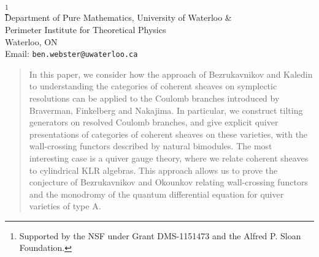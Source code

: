 \documentclass[final]{amsart}
\begin{document}
\begin{center}
\noindent {\large  \bf \thetitle}
\medskip

\footnote{Supported by the NSF under Grant
  DMS-1151473 and the Alfred P. Sloan Foundation.}\\  
Department of Pure Mathematics, University of Waterloo \& \\
 Perimeter Institute for Theoretical Physics\\
Waterloo, ON\\
Email: {\tt ben.webster@uwaterloo.ca}
\end{center}
\bigskip
{\small
\begin{quote}
In this paper, we consider how the approach of Bezrukavnikov and Kaledin to understanding the categories of coherent sheaves on symplectic resolutions can be applied to the Coulomb branches introduced by Braverman, Finkelberg and Nakajima.  In particular, we construct tilting generators on resolved Coulomb branches, and give explicit quiver presentations of categories of coherent sheaves on these varieties, with the wall-crossing functors described by natural bimodules.   The most interesting case is a quiver gauge theory, where we relate coherent sheaves to cylindrical KLR algebras.  This approach allows us to prove the conjecture of Bezrukavnikov and Okounkov relating wall-crossing functors and the monodromy of the quantum differential equation for quiver varieties of type A.  
\end{quote}
}


 
 


\printbibliography[heading=none]
\end{document}
